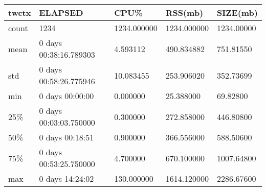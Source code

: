 \documentclass{article}
\begin{document}
\begin{table}[H]
\begin{tabular}{|l|l|l|l|l|}
\hline twctx& ELAPSED&  CPU\%&  RSS(mb)&  SIZE(mb) \\
\hline count&   1234& 1234.000000& 1234.000000& 1234.00000 \\
\hline mean&  0 days 00:38:16.789303&   4.593112&  490.834882&  751.81550 \\
\hline std&  0 days 00:58:26.775946&  10.083455&  253.906020&  352.73699 \\
\hline min&   0 days 00:00:00&   0.000000&  25.388000&  69.82800 \\
\hline 25\%&  0 days 00:03:03.750000&   0.300000&  272.858000&  446.80800 \\
\hline 50\%&   0 days 00:18:51&   0.900000&  366.556000&  588.50600 \\
\hline 75\%&  0 days 00:53:25.750000&   4.700000&  670.100000& 1007.64800 \\
\hline max&   0 days 14:24:02&  130.000000& 1614.120000& 2286.67600 \\
\hline 
\end{tabular}
\label{TABLE-SessionSizetwctx}
\end{table}
\end{document}
